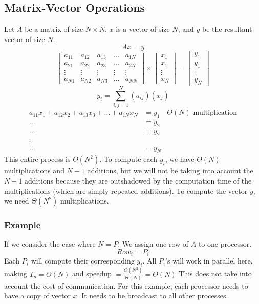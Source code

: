 \documentclass{math}
\begin{document}
\subsection*{Matrix-Vector Operations}
Let \( A \) be a matrix of size \( N\times N \), \( x \) is a vector of size
\( N \), and \( y \) be the resultant vector of size \( N \).
\[ Ax = y \]
\[ \begin{bmatrix}
    a_{11} & a_{12} & a_{13} & \dots & a_{1N} \\
    a_{21} & a_{22} & a_{23} & \dots & a_{2N} \\
    \vdots & \vdots & \vdots & \vdots & \vdots \\
    a_{N1} & a_{N2} & a_{N3} & \dots & a_{NN}
  \end{bmatrix}\times\begin{bmatrix}
    x_1 \\ x_1 \\ \vdots \\ x_N
  \end{bmatrix} = \begin{bmatrix}
    y_1 \\ y_1 \\ \vdots \\ y_N
  \end{bmatrix}
\]
\[ y_i = \sum_{i,j=1}^{N}(a_{ij})(x_j) \]
\begin{align*}
  a_{11}x_1+a_{12}x_2+a_{13}x_3+\dots+a_{1N}x_N &= y_1
    \quad \Theta(N)\text{ multiplication} \\
  \dots &= y_2 \\
  \dots &= y_2 \\
  \vdots \\
  \dots &= y_N
\end{align*}
This entire process is \( \Theta(N^2) \). To compute each \( y_i \), we have
\( \Theta(N) \) multiplications and \( N-1 \) additions, but we will not be
taking into account the \( N-1 \) additions because they are outshadowed by the
computation time of the multiplications (which are simply repeated additions).
To compute the vector \( y \), we need \( \Theta(N^2) \) multiplications.

\subsubsection*{Example}
If we consider the case where \( N = P \). We assign one row of \( A \) to one
processor.
\[ Row_i = P_i \]
Each \( P_i \) will compute their corresponding \( y_i \). All \( P_i \)'s will
work in parallel here, making \( T_p = \Theta(N) \) and speedup
\( = \frac{\Theta(N^2)}{\Theta(N)} = \Theta(N) \)
This does not take into account the cost of communication. For this example,
each processor needs to have a copy of vector \( x \). It needs to be broadcast
to all other processes.
\end{document}
